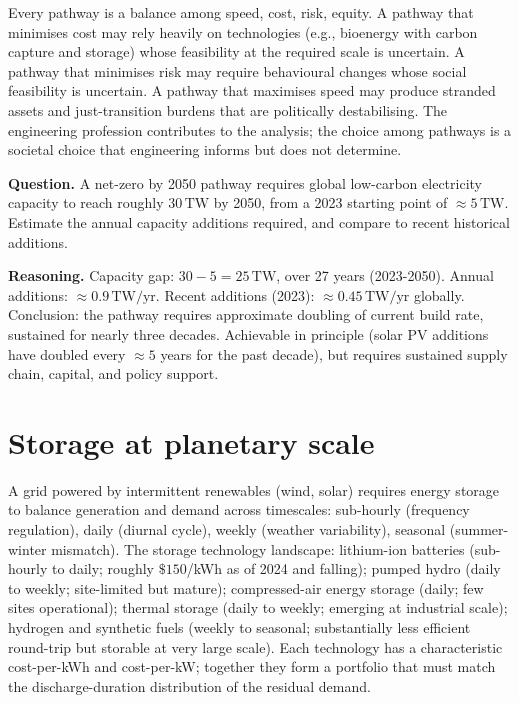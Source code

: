 \begin{archetype}
Every pathway is a balance among speed, cost, risk, equity. A pathway that minimises cost may rely heavily on technologies (e.g., bioenergy with carbon capture and storage) whose feasibility at the required scale is uncertain. A pathway that minimises risk may require behavioural changes whose social feasibility is uncertain. A pathway that maximises speed may produce stranded assets and just-transition burdens that are politically destabilising. The engineering profession contributes to the analysis; the choice among pathways is a societal choice that engineering informs but does not determine.
\end{archetype}

\begin{estimation}
\textbf{Question.} A net-zero by 2050 pathway requires global low-carbon electricity capacity to reach roughly $30\,\text{TW}$ by 2050, from a 2023 starting point of $\approx 5\,\text{TW}$. Estimate the annual capacity additions required, and compare to recent historical additions.

\textbf{Reasoning.} Capacity gap: $30 - 5 = 25\,\text{TW}$, over 27 years (2023-2050). Annual additions: $\approx 0.9\,\text{TW/yr}$. Recent additions (2023): $\approx 0.45\,\text{TW/yr}$ globally. Conclusion: the pathway requires approximate doubling of current build rate, sustained for nearly three decades. Achievable in principle (solar PV additions have doubled every $\approx 5$ years for the past decade), but requires sustained supply chain, capital, and policy support.
\end{estimation}

\section{Storage at planetary scale}

A grid powered by intermittent renewables (wind, solar) requires energy storage to balance generation and demand across timescales: sub-hourly (frequency regulation), daily (diurnal cycle), weekly (weather variability), seasonal (summer-winter mismatch). The storage technology landscape: lithium-ion batteries (sub-hourly to daily; roughly $\$150$/kWh as of 2024 and falling); pumped hydro (daily to weekly; site-limited but mature); compressed-air energy storage (daily; few sites operational); thermal storage (daily to weekly; emerging at industrial scale); hydrogen and synthetic fuels (weekly to seasonal; substantially less efficient round-trip but storable at very large scale). Each technology has a characteristic cost-per-kWh and cost-per-kW; together they form a portfolio that must match the discharge-duration distribution of the residual demand.

